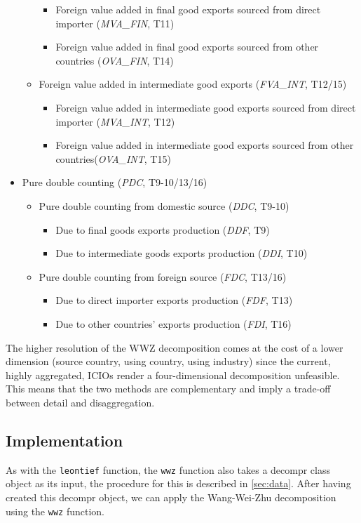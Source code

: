\documentclass[a4paper]{article}\usepackage[]{graphicx}\usepackage[]{color}
\begin{document}
\begin{itemize}
\begin{itemize}
\begin{itemize}
\item Foreign value added in final good exports sourced from direct importer (\textit{MVA\_FIN}, T11)
\item Foreign value added in final good exports sourced from other countries (\textit{OVA\_FIN}, T14)
\end{itemize}
\item Foreign value added in intermediate good exports (\textit{FVA\_INT}, T12/15)
\begin{itemize}
\item Foreign value added in intermediate good exports sourced from direct importer (\textit{MVA\_INT}, T12)
\item Foreign value added in intermediate good exports sourced from other countries(\textit{OVA\_INT}, T15)
\end{itemize}
\end{itemize}
\item Pure double counting (\textit{PDC}, T9-10/13/16)
\begin{itemize}
\item Pure double counting from domestic source (\textit{DDC}, T9-10)
\begin{itemize}
\item Due to final goods exports production (\textit{DDF}, T9)
\item Due to intermediate goods exports production (\textit{DDI}, T10)
\end{itemize}
\item Pure double counting from foreign source (\textit{FDC}, T13/16)
\begin{itemize}
\item Due to direct importer exports production (\textit{FDF}, T13)
\item Due to other countries' exports production (\textit{FDI}, T16)
\end{itemize}
\end{itemize}
\end{itemize}
The higher resolution of the WWZ decomposition comes at the cost of a lower dimension (source country, using country, using industry) since the current, highly aggregated, ICIOs render a four-dimensional decomposition unfeasible.
This means that the two methods are complementary and imply a trade-off between detail and disaggregation.

\subsection{Implementation}
As with the \verb!leontief! function, 
the \verb!wwz! function also takes a decompr class object as its input, 
the procedure for this is described in \cref{sec:data}.
After having created this decompr object, 
we can apply the Wang-Wei-Zhu decomposition using the \verb!wwz! function.
\end{document}
